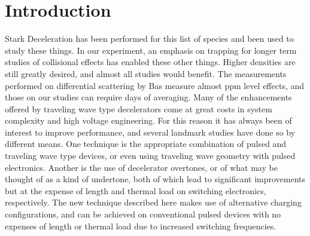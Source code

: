 \documentclass[%
 reprint,
 amsmath,amssymb,
 aps,
pra,
]{revtex4-1}
\begin{document}
\section{Introduction}
Stark Deceleration has been performed for this list of species and been used to study these things. In our experiment, an emphasis on trapping for longer term studies of collisional effects has enabled these other things. Higher densities are still greatly desired, and almost all studies would benefit. The measurements performed on differential scattering by Bas measure almost ppm level effects, and those on our studies can require days of averaging. Many of the enhancements offered by traveling wave type decelerators come at great costs in system complexity and high voltage engineering. For this reason it has always been of interest to improve performance, and several landmark studies have done so by different means. One technique is the appropriate combination of pulsed and traveling wave type devices, or even using traveling wave geometry with pulsed electronics. Another is the use of decelerator overtones, or of what may be thought of as a kind of undertone, both of which lead to significant improvements but at the expense of length and thermal load on switching electronics, respectively. The new technique described here makes use of alternative charging configurations, and can be achieved on conventional pulsed devices with no expenses of length or thermal load due to increased switching frequencies.
\end{document}

